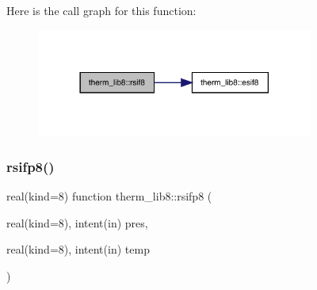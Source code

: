 Here is the call graph for this function\+:
\nopagebreak
\begin{figure}[H]
\begin{center}
\leavevmode
\includegraphics[width=258pt]{namespacetherm__lib8_a07814f1748b78bb1eb6f7cf12c6e2244_cgraph}
\end{center}
\end{figure}
\mbox{\label{namespacetherm__lib8_ad59e6dc4fe8995e92cdae7dd3a340efc}} 
\subsubsection{\texorpdfstring{rsifp8()}{rsifp8()}}
{\footnotesize\ttfamily real(kind=8) function therm\+\_\+lib8\+::rsifp8 (\begin{DoxyParamCaption}\item[{real(kind=8), intent(in)}]{pres,  }\item[{real(kind=8), intent(in)}]{temp }\end{DoxyParamCaption})}

